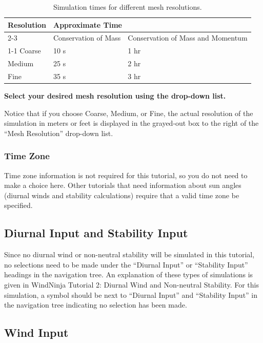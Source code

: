 \documentclass[12pt]{article}
\begin{document}
\begin{table}[]
\centering
\caption{Simulation times for different mesh resolutions.}
\label{res_table}
\begin{tabular}{lll}
\toprule
\multirow{2}{*}{Resolution} & \multicolumn{2}{l}{Approximate Time} \\ \cmidrule(l){2-3} 
 & Conservation of Mass & Conservation of Mass and Momentum \\ \cmidrule(r){1-1}
Coarse & 10 s & 1 hr \\
Medium & 25 s & 2 hr \\
Fine & 35 s & 3 hr \\ \bottomrule
\end{tabular}
\end{table}

\textbf{\color{red}Select your desired mesh resolution using the  drop-down list.}

Notice that if you choose Coarse, Medium, or Fine, the actual resolution of the simulation in meters or feet is displayed in the grayed-out box to the right of the “Mesh Resolution” drop-down list.

\subsubsection{Time Zone}

Time zone information is not required for this tutorial, so you do not need to make a choice here.  
Other tutorials that need information about sun angles (diurnal winds and stability calculations) require that a valid time zone be specified.

\subsection{Diurnal Input and Stability Input}

Since no diurnal wind or non-neutral stability will be simulated in this tutorial, no selections need to be made under the “Diurnal Input” or “Stability Input” headings in the navigation tree.  
An explanation of these types of simulations is given in WindNinja Tutorial 2: Diurnal Wind and Non-neutral Stability.  
For this simulation, a   symbol should be next to “Diurnal Input” and “Stability Input” in the navigation tree indicating no selection has been made.

\subsection{Wind Input}
\end{document}
